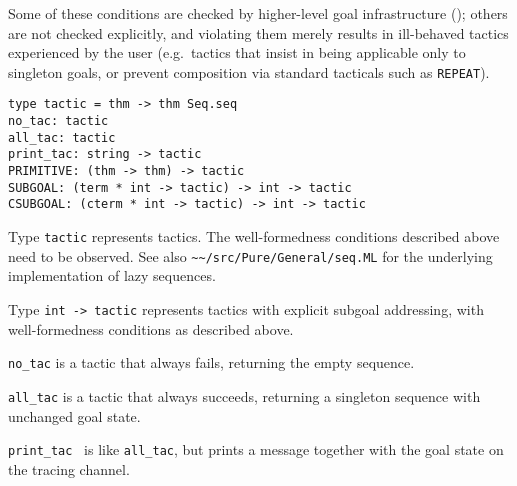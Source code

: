 \begin{isabellebody}
\begin{isamarkuptext}
  Some of these conditions are checked by higher-level goal
  infrastructure (); others are not checked
  explicitly, and violating them merely results in ill-behaved tactics
  experienced by the user (e.g.\ tactics that insist in being
  applicable only to singleton goals, or prevent composition via
  standard tacticals such as \verb|REPEAT|).%
\end{isamarkuptext}%
\isamarkuptrue%
%
\isadelimmlref
%
\endisadelimmlref
%
\isatagmlref
%
\begin{isamarkuptext}%
\begin{mldecls}
  \verb|type tactic = thm -> thm Seq.seq| \\
  \verb|no_tac: tactic| \\
  \verb|all_tac: tactic| \\
  \verb|print_tac: string -> tactic| \\[1ex]
  \verb|PRIMITIVE: (thm -> thm) -> tactic| \\[1ex]
  \verb|SUBGOAL: (term * int -> tactic) -> int -> tactic| \\
  \verb|CSUBGOAL: (cterm * int -> tactic) -> int -> tactic| \\
  \end{mldecls}

  \begin{description}

  \item Type \verb|tactic| represents tactics.  The
  well-formedness conditions described above need to be observed.  See
  also \verb|~~/src/Pure/General/seq.ML| for the underlying
  implementation of lazy sequences.

  \item Type \verb|int -> tactic| represents tactics with
  explicit subgoal addressing, with well-formedness conditions as
  described above.

  \item \verb|no_tac| is a tactic that always fails, returning the
  empty sequence.

  \item \verb|all_tac| is a tactic that always succeeds, returning a
  singleton sequence with unchanged goal state.

  \item \verb|print_tac|~ is like \verb|all_tac|, but
  prints a message together with the goal state on the tracing
  channel.


\end{description}
\end{isamarkuptext}
\end{isabellebody}
